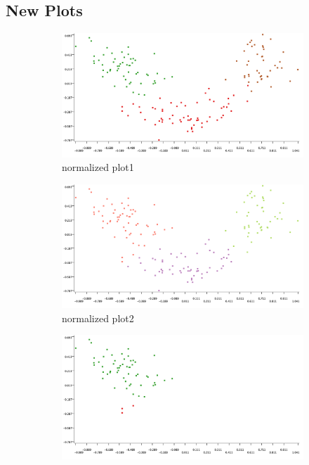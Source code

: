 \documentclass[11pt]{article}
\begin{document}
		\subsection*{New Plots}
			\iftrue
			\begin{figure}[H]
				\centering
				\begin{subfigure}{0.4\textwidth}
					\includegraphics[width=\textwidth]{res/t2/t24/t24-plot21}
					\caption{normalized plot1}
					\label{fig:first}
				\end{subfigure}
				\hfill
				\begin{subfigure}{0.4\textwidth}
					\includegraphics[width=\textwidth]{res/t2/t24/t24-plot22}
					\caption{normalized plot2}
					\label{fig:second}
				\end{subfigure}
				\hfill
				\begin{subfigure}{0.3\textwidth}
					\includegraphics[width=\textwidth]{res/t2/t24/t24-plot23a}

\end{subfigure}
\end{figure}
\end{document}
